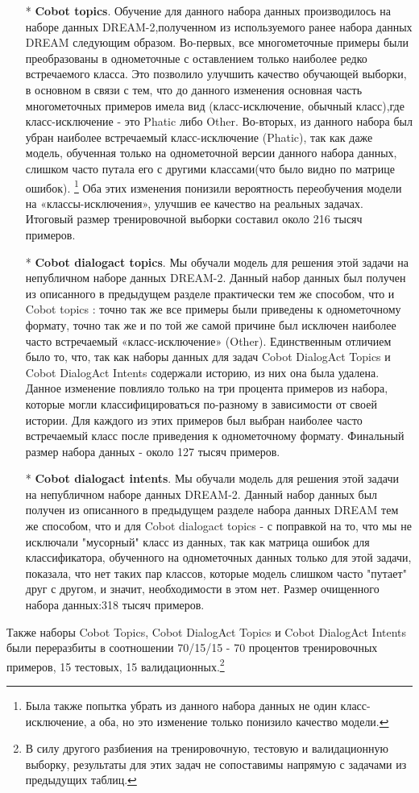 \begin{itemize}
\item[*]\textbf{Cobot topics}. Обучение для данного набора данных производилось на наборе данных DREAM-2,полученном из используемого ранее набора данных {DREAM} следующим образом.
Во-первых, все многометочные примеры были преобразованы в однометочные с оставлением только наиболее редко встречаемого класса. Это позволило улучшить качество обучающей выборки, в основном в связи с тем, что до данного изменения основная часть многометочных примеров имела вид (класс-исключение, обычный класс),где класс-исключение - это Phatic либо Other. Во-вторых, из данного набора был убран наиболее встречаемый класс-исключение (Phatic), так как даже модель, обученная только на однометочной версии данного набора данных, слишком часто путала его с другими классами(что было видно по матрице ошибок). \footnote{Была также попытка убрать из данного набора данных не один класс-исключение, а оба, но это изменение только понизило качество модели.}
Оба этих изменения понизили вероятность переобучения модели на «классы-исключения», улучшив ее качество на реальных задачах. Итоговый размер тренировочной выборки составил около 216 тысяч примеров.
\item[*]\textbf{Cobot dialogact topics}. Мы обучали модель для решения этой задачи на непубличном наборе данных DREAM-2. Данный набор данных был получен из описанного в предыдущем разделе практически тем же способом, что и {Cobot topics} : точно так же все примеры были приведены к однометочному формату, точно так же и по той же самой причине был исключен наиболее часто встречаемый «класс-исключение» (Other).
 Единственным отличием было то, что, так как наборы данных для задач {Cobot DialogAct Topics} и {Cobot DialogAct Intents} содержали историю, из них она была удалена. Данное изменение повлияло только на три процента примеров из набора, которые могли классифицироваться по-разному в зависимости от своей истории. Для каждого из этих примеров был выбран наиболее часто встречаемый класс после приведения к однометочному формату. Финальный размер набора данных - около 127 тысяч примеров.

\item[*]\textbf{Cobot dialogact intents}. Мы обучали модель для решения этой задачи на непубличном наборе данных DREAM-2. Данный набор данных был получен из описанного в предыдущем разделе набора данных {DREAM} тем же способом, что и для {Cobot dialogact topics} - с поправкой на то, что мы не исключали "мусорный" класс из данных, так как матрица ошибок для классификатора, обученного на однометочных данных только для этой задачи, показала, что нет таких пар классов, которые модель слишком часто "путает" друг с другом, и значит, необходимости в этом нет. Размер очищенного набора данных:318 тысяч примеров.
\end{itemize}
Также наборы {Cobot Topics}, {Cobot DialogAct Topics} и {Cobot DialogAct Intents} были переразбиты в соотношении 70/15/15 - 70 процентов тренировочных примеров, 15 тестовых, 15 валидационных.\footnote{В силу другого разбиения на тренировочную, тестовую и валидационную выборку, результаты для этих задач не сопоставимы напрямую с задачами из предыдущих таблиц.}

